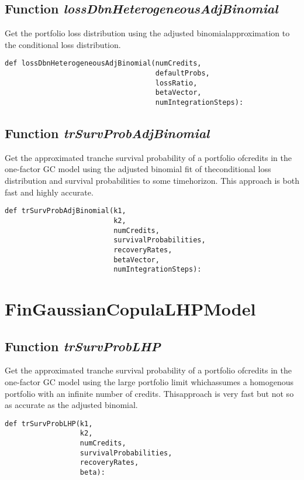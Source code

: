 \documentclass[twoside,11pt]{book}
\begin{document}
\subsection{Function {\it lossDbnHeterogeneousAdjBinomial}}
Get the portfolio loss distribution using the adjusted binomialapproximation to the conditional loss distribution. 

\begin{lstlisting}
def lossDbnHeterogeneousAdjBinomial(numCredits,
                                    defaultProbs,
                                    lossRatio,
                                    betaVector,
                                    numIntegrationSteps):
\end{lstlisting}

\subsection{Function {\it trSurvProbAdjBinomial}}
Get the approximated tranche survival probability of a portfolio ofcredits in the one-factor GC model using the adjusted binomial fit of theconditional loss distribution and survival probabilities to some timehorizon. This approach is both fast and highly accurate. 

\begin{lstlisting}
def trSurvProbAdjBinomial(k1,
                          k2,
                          numCredits,
                          survivalProbabilities,
                          recoveryRates,
                          betaVector,
                          numIntegrationSteps):
\end{lstlisting}

\newpage
\section{FinGaussianCopulaLHPModel}

\subsection{Function {\it trSurvProbLHP}}
Get the approximated tranche survival probability of a portfolio ofcredits in the one-factor GC model using the large portfolio limit whichassumes a homogenous portfolio with an infinite number of credits. Thisapproach is very fast but not so as accurate as the adjusted binomial. 

\begin{lstlisting}
def trSurvProbLHP(k1,
                  k2,
                  numCredits,
                  survivalProbabilities,
                  recoveryRates,
                  beta):
\end{lstlisting}
\end{document}
